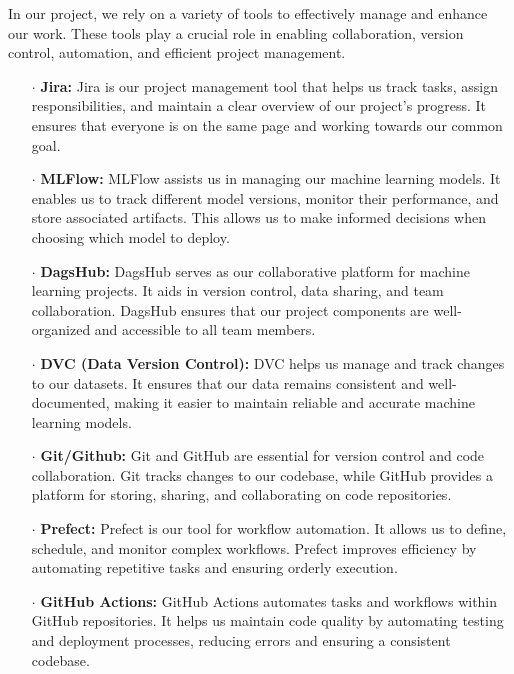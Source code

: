 \documentclass{report}
\begin{document}
In our project, we rely on a variety of tools to effectively manage and enhance our work. These tools play a crucial role in enabling collaboration, version control, automation, and efficient project management.

\begin{itemize}
    \item[$\cdot$] \textbf{Jira:} Jira is our project management tool that helps us track tasks, assign responsibilities, and maintain a clear overview of our project's progress. It ensures that everyone is on the same page and working towards our common goal.
    
    \item[$\cdot$] \textbf{MLFlow:} MLFlow assists us in managing our machine learning models. It enables us to track different model versions, monitor their performance, and store associated artifacts. This allows us to make informed decisions when choosing which model to deploy.
    
    \item[$\cdot$] \textbf{DagsHub:} DagsHub serves as our collaborative platform for machine learning projects. It aids in version control, data sharing, and team collaboration. DagsHub ensures that our project components are well-organized and accessible to all team members.
    
    \item[$\cdot$] \textbf{DVC (Data Version Control):} DVC helps us manage and track changes to our datasets. It ensures that our data remains consistent and well-documented, making it easier to maintain reliable and accurate machine learning models.
    
    \item[$\cdot$] \textbf{Git/Github:} Git and GitHub are essential for version control and code collaboration. Git tracks changes to our codebase, while GitHub provides a platform for storing, sharing, and collaborating on code repositories.
    
    \item[$\cdot$] \textbf{Prefect:} Prefect is our tool for workflow automation. It allows us to define, schedule, and monitor complex workflows. Prefect improves efficiency by automating repetitive tasks and ensuring orderly execution.
    
    \item[$\cdot$] \textbf{GitHub Actions:} GitHub Actions automates tasks and workflows within GitHub repositories. It helps us maintain code quality by automating testing and deployment processes, reducing errors and ensuring a consistent codebase.
\end{itemize}
\end{document}
